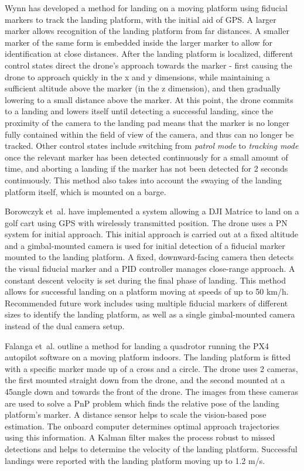 \label{section:related_work}
Wynn \cite{wynn} has developed a method for landing on a moving platform using fiducial markers to track the landing platform, with the initial aid of GPS. A larger marker allows recognition of the landing platform from far distances. A smaller marker of the same form is embedded inside the larger marker to allow for identification at close distances. After the landing platform is localized, different control states direct the drone's approach towards the marker - first causing the drone to approach quickly in the x and y dimensions, while maintaining a sufficient altitude above the marker (in the z dimension), and then gradually lowering to a small distance above the marker. At this point, the drone commits to a landing and lowers itself until detecting a successful landing, since the proximity of the camera to the landing pad means that the marker is no longer fully contained within the field of view of the camera, and thus can no longer be tracked. Other control states include switching from \textit{patrol mode} to \textit{tracking mode} once the relevant marker has been detected continuously for a small amount of time, and aborting a landing if the marker has not been detected for 2 seconds continuously. This method also takes into account the swaying of the landing platform itself, which is mounted on a barge.

Borowczyk et~al.\@ \cite{high_velocity_landing} have implemented a system allowing a DJI Matrice to land on a golf cart using \gls{GPS} with wirelessly transmitted position. The drone uses a \gls{PN} system for initial approach. This initial approach is carried out at a fixed altitude and a gimbal-mounted camera is used for initial detection of a fiducial marker mounted to the landing platform. A fixed, downward-facing camera then detects the visual fiducial marker and a \gls{PID} controller manages close-range approach. A constant descent velocity is set during the final phase of landing. This method allows for successful landing on a platform moving at speeds of up to 50 km/h. Recommended future work includes using multiple fiducial markers of different sizes to identify the landing platform, as well as a single gimbal-mounted camera instead of the dual camera setup.

Falanga et~al.\@ \cite{vision_based_x_platform} outline a method for landing a quadrotor running the PX4 autopilot software on a moving platform indoors. The landing platform is fitted with a specific marker made up of a cross and a circle. The drone uses 2 cameras, the first mounted straight down from the drone, and the second mounted at a 45\degree angle down and towards the front of the drone. The images from these cameras are used to solve a \gls{PnP} problem which finds the relative pose of the landing platform's marker. A distance sensor helps to scale the vision-based pose estimation. The onboard computer determines optimal approach trajectories using this information. A Kalman filter makes the process robust to missed detections and helps to determine the velocity of the landing platform. Successful landings were reported with the landing platform moving up to 1.2 m/s.

